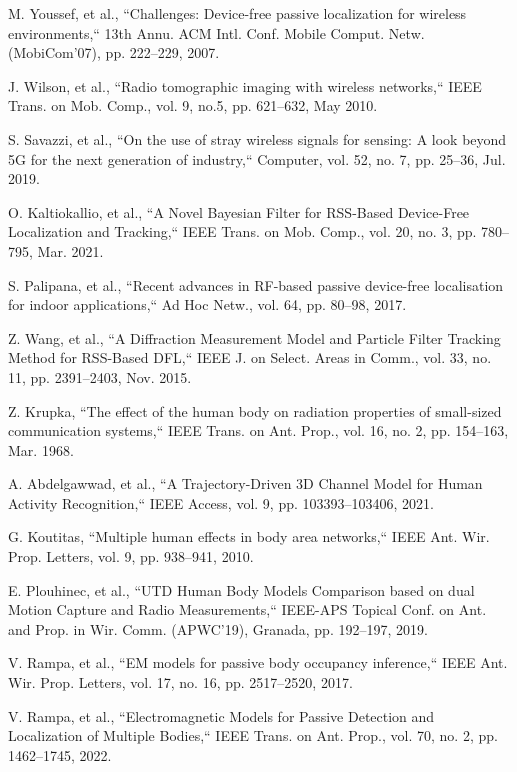 \begin{thebibliography}{10}
	
 M. Youssef, et al., ``Challenges: Device-free passive localization for wireless environments,`` 13th Annu. ACM Intl. Conf. Mobile Comput. Netw. (MobiCom'07), pp. 222--229, 2007.

J. Wilson, et al., ``Radio tomographic imaging with wireless networks,`` IEEE Trans. on Mob. Comp., vol. 9, no.5, pp. 621--632, May 2010.

S. Savazzi, et al., ``On the use of stray wireless signals for sensing: A look beyond 5G for the next generation of industry,`` Computer, vol. 52, no. 7, pp. 25--36, Jul. 2019.

O. Kaltiokallio, et al., ``A Novel Bayesian Filter for RSS-Based Device-Free Localization and Tracking,`` IEEE Trans. on Mob. Comp., vol. 20, no. 3, pp. 780--795, Mar. 2021.

S. Palipana, et al., ``Recent advances in RF-based passive device-free localisation for indoor applications,`` Ad Hoc Netw., vol. 64, pp. 80--98, 2017.

 Z. Wang, et al., ``A Diffraction Measurement Model and Particle Filter Tracking Method for RSS-Based DFL,`` IEEE J. on Select. Areas in Comm., vol. 33, no. 11, pp. 2391--2403, Nov. 2015.

 Z. Krupka, ``The effect of the human body on radiation properties of small-sized communication systems,`` IEEE Trans. on Ant. Prop., vol. 16, no. 2, pp. 154--163, Mar. 1968.

A. Abdelgawwad, et al., ``A Trajectory-Driven 3D Channel Model for Human Activity  Recognition,`` IEEE Access, vol. 9, pp. 103393--103406, 2021.

G. Koutitas, ``Multiple human effects in body area networks,`` IEEE Ant. Wir. Prop. Letters, vol. 9, pp. 938--941, 2010.

E. Plouhinec, et al., ``UTD Human Body Models Comparison based on dual Motion Capture and Radio Measurements,`` IEEE-APS Topical Conf. on Ant. and Prop. in Wir. Comm. (APWC'19), Granada, pp. 192--197, 2019.

V. Rampa, et al., ``EM models for passive body occupancy inference,`` IEEE Ant. Wir. Prop. Letters, vol. 17, no. 16, pp. 2517--2520, 2017.

V. Rampa, et al., ``Electromagnetic Models for Passive Detection and Localization of Multiple Bodies,`` IEEE Trans. on Ant. Prop., vol. 70, no. 2, pp. 1462--1745, 2022.


\end{thebibliography}
